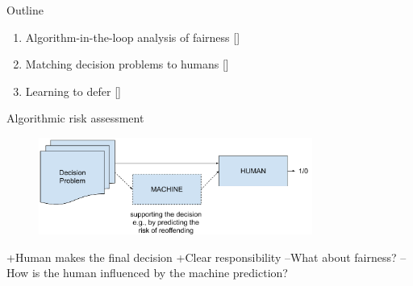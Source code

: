 \documentclass[11pt]{beamer}
\begin{document}
\begin{frame}{Outline}
\begin{enumerate}
    \item Algorithm-in-the-loop analysis of fairness {\footnotesize [\cite{green2019disparate}]}\vspace{2pt}
    \item Matching decision problems to humans {\footnotesize [\cite{valera2018enhancing}]}\vspace{2pt}
    \item Learning to defer  {\footnotesize [\cite{madras2018predict}]}\vspace{2pt}
\end{enumerate}
\end{frame}

\begin{frame}{Algorithmic risk assessment}
\begin{figure}[t!]
    \centering
        \includegraphics[width=0.8\textwidth]{Figures/human_decision.pdf}
\end{figure}
+\quad Human makes the final decision
+\quad Clear responsibility\vspace{4pt}
--\quad What about fairness?
--\quad How is the human influenced by the machine prediction?
\end{frame}
\end{document}
